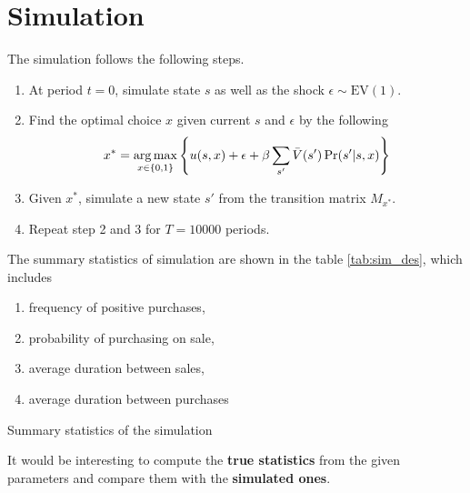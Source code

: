 \documentclass[12pt]{article}[margin=1in]
\begin{document}
\section{Simulation}
The simulation follows the following steps.
\begin{enumerate}
    \item At period $t=0$, simulate state $s$ as well as the shock $\epsilon \sim
              \text{EV}(1)$.
    \item Find the optimal choice $x$ given current $s$ and $\epsilon$ by the following
          \begin{equation*}
              x^* = \operatorname*{arg\,max}_{x
                  \in \{0,1\}}  \left\{ u(s,x) + \epsilon+ \beta
              \sum_{s'}\bar{V}(s')\Pr(s'|s,x) \right\}
          \end{equation*}
    \item Given $x^*$, simulate a new state $s'$ from the transition matrix $M_{x^*}$.
    \item Repeat step 2 and 3 for $T=10000$ periods.
\end{enumerate}
The summary statistics of simulation are shown in the table \ref{tab:sim_des}, which includes
\begin{enumerate}
    \item frequency of positive purchases,
    \item probability of purchasing on sale,
    \item average duration between sales,
    \item average duration between purchases
\end{enumerate}\begin{table}
    \centering
    
    \caption{Summary statistics of the simulation}
    \label{tab:sim_des}
\end{table}

It would be interesting to compute the \textbf{true statistics} from the given
parameters and compare them with the \textbf{simulated ones}.
\end{document}
